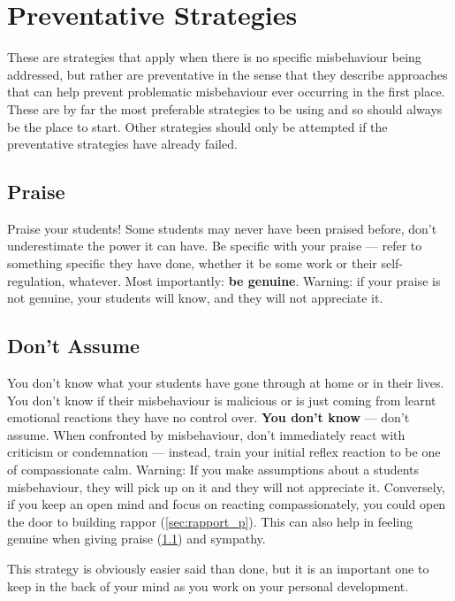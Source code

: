 \documentclass[12pt]{report}
\begin{document}
\chapter{Preventative Strategies}
\label{chap:preventative}

These are strategies that apply when there is no specific misbehaviour being addressed, but rather are preventative in the sense that they describe approaches that can help prevent problematic misbehaviour ever occurring in the first place. These are by far the most preferable strategies to be using and so should always be the place to start. Other strategies should only be attempted if the preventative strategies have already failed. 

\section{Praise}
\label{sec:praise_p}

Praise your students! Some students may never have been praised before, don't underestimate the power it can have. Be specific with your praise --- refer to something specific they have done, whether it be some work or their self-regulation, whatever. Most importantly: \textbf{be genuine}. Warning: if your praise is not genuine, your students will know, and they will not appreciate it.



\section{Don't Assume}
\label{sec:dont_assume_p}

You don't know what your students have gone through at home or in their lives. You don't know if their misbehaviour is malicious or is just coming from learnt emotional reactions they have no control over. \textbf{You don't know} --- don't assume. When confronted by misbehaviour, don't immediately react with criticism or condemnation --- instead, train your initial reflex reaction to be one of compassionate calm. Warning: If you make assumptions about a students misbehaviour, they will pick up on it and they will not appreciate it. Conversely, if you keep an open mind and focus on reacting compassionately, you could open the door to building rappor (\ref{sec:rapport_p}). This can also help in feeling genuine when giving praise (\ref{sec:praise_p}) and sympathy.

This strategy is obviously easier said than done, but it is an important one to keep in the back of your mind as you work on your personal development.
\end{document}
